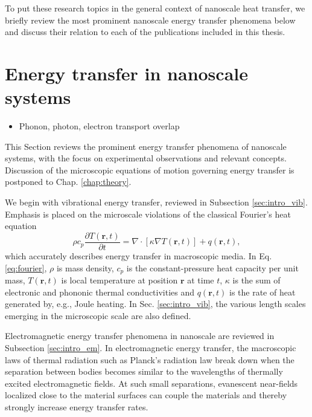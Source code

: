 To put these research topics in the general context of nanoscale heat transfer, we briefly review the most prominent nanoscale energy transfer phenomena below and discuss their relation to each of the publications included in this thesis. 




\section{Energy transfer in nanoscale systems}
\begin{itemize}
 \item Phonon, photon, electron transport overlap
\end{itemize}
This Section reviews the prominent energy transfer phenomena of nanoscale systems, with the focus on experimental observations and relevant concepts. Discussion of the microscopic equations of motion governing energy transfer is postponed to Chap. \ref{chap:theory}. 

We begin with vibrational energy transfer, reviewed in Subsection \ref{sec:intro_vib}. Emphasis is placed on the microscale violations of the classical Fourier's heat equation \cite{fetter}
\begin{equation}
 \rho c_p \frac{\partial T(\mathbf{r},t)}{\partial t} =  \nabla \cdot [\kappa \nabla T(\mathbf{r},t)] + q(\mathbf{r},t), \label{eq:fourier}
\end{equation}
which accurately describes energy transfer in macroscopic media. In Eq. \eqref{eq:fourier}, $\rho$ is mass density, $c_p$ is the constant-pressure heat capacity per unit mass, $T(\mathbf{r},t)$ is local temperature at position $\mathbf{r}$ at time $t$, $\kappa$ is the sum of electronic and phononic thermal conductivities and $q(\mathbf{r},t)$ is the rate of heat generated by, e.g., Joule heating. In Sec. \ref{sec:intro_vib}, the various length scales emerging in the microscopic scale are also defined. 


Electromagnetic energy transfer phenomena in nanoscale are reviewed in Subsection \ref{sec:intro_em}. In electromagnetic energy transfer, the macroscopic laws of thermal radiation such as Planck's radiation law break down when the separation between bodies becomes similar to the wavelengths of thermally excited electromagnetic fields. At such small separations, evanescent near-fields localized close to the material surfaces can couple the materials and thereby strongly increase energy transfer rates. %

